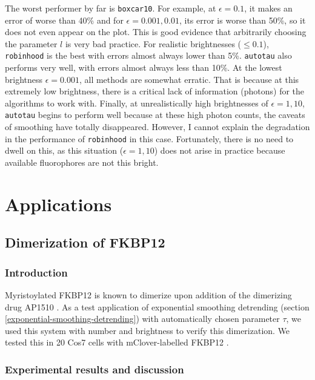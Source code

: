 \documentclass[12pt,]{book}
\theoremstyle{definition}
\theoremstyle{definition}
\theoremstyle{definition}
\theoremstyle{remark}
\begin{document}
The worst performer by far is \texttt{boxcar10}. For example, at
\(\epsilon = 0.1\), it makes an error of worse than 40\% and for
\(\epsilon = 0.001, 0.01\), its error is worse than 50\%, so it does not
even appear on the plot. This is good evidence that arbitrarily choosing
the parameter \(l\) is very bad practice. For realistic brightnesses
(\(\le 0.1\)), \texttt{robinhood} is the best with errors almost always
lower than 5\%. \texttt{autotau} also performs very well, with errors
almost always less than 10\%. At the lowest brightness
\(\epsilon = 0.001\), all methods are somewhat erratic. That is because
at this extremely low brightness, there is a critical lack of
information (photons) for the algorithms to work with. Finally, at
unrealistically high brightnesses of \(\epsilon = 1, 10\),
\texttt{autotau} begins to perform well because at these high photon
counts, the caveats of smoothing have totally disappeared. However, I
cannot explain the degradation in the performance of \texttt{robinhood}
in this case. Fortunately, there is no need to dwell on this, as this
situation (\(\epsilon = 1, 10\)) does not arise in practice because
available fluorophores are not this bright.

\chapter{Applications}\label{applications}

\section{Dimerization of FKBP12}\label{dimerization-of-fkbp12}

\subsection{Introduction}\label{introduction}

Myristoylated FKBP12 is known to dimerize upon addition of the
dimerizing drug AP1510 \citep{Amara}. As a test application of
exponential smoothing detrending (section
\ref{exponential-smoothing-detrending}) with automatically chosen
parameter \(\tau\), we used this system with number and brightness to
verify this dimerization. We tested this in 20 Cos7 cells with
mClover-labelled FKBP12 \citep{nandb}.

\subsection{Experimental results and
discussion}\label{experimental-results-and-discussion}
\end{document}
